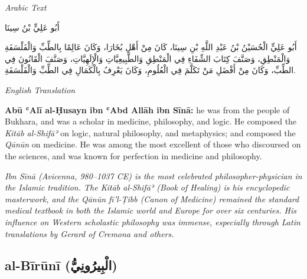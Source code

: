 \documentclass[11pt,a4paper]{article}
\def\RL#1{\beginR#1\endR}
\newcommand{\cnote}[1]{\textcolor{notecolor}{\textit{#1}}}
\newcommand{\textarabic}[1]{{\arabicfont\RL{#1}}}
\newenvironment{arabiccol}{%
  \begin{minipage}[t]{0.48\textwidth}%
  \begin{tcolorbox}[colback=leftbg,colframe=rulecolor,boxrule=0.4pt,arc=2pt,left=5pt,right=5pt,top=5pt,bottom=5pt]%
  \centering\textit{\footnotesize Arabic Text}\\[0.4em]%
  \raggedright\arabicfont\small%
}{%
  \end{tcolorbox}%
  \end{minipage}%
}
\newenvironment{englishcol}{%
  \begin{minipage}[t]{0.48\textwidth}%
  \begin{tcolorbox}[colback=rightbg,colframe=rulecolor,boxrule=0.4pt,arc=2pt,left=5pt,right=5pt,top=5pt,bottom=5pt]%
  \centering\textit{\footnotesize English Translation}\\[0.4em]%
  \raggedright\small%
}{%
  \end{tcolorbox}%
  \end{minipage}%
}
\begin{document}
\noindent
\begin{arabiccol}
\beginR
أَبُو عَلِيٍّ بْنُ سِينَا

أَبُو عَلِيٍّ الْحُسَيْنُ بْنُ عَبْدِ اللَّهِ بْنِ سِينَا، كَانَ مِنْ أَهْلِ بُخَارَا، وَكَانَ عَالِمًا بِالطِّبِّ وَالْفَلْسَفَةِ وَالْمَنْطِقِ، وَصَنَّفَ كِتَابَ الشِّفَاءِ فِي الْمَنْطِقِ وَالطَّبِيعِيَّاتِ وَالْإِلَهِيَّاتِ، وَصَنَّفَ الْقَانُونَ فِي الطِّبِّ، وَكَانَ مِنْ أَفْضَلِ مَنْ تَكَلَّمَ فِي الْعُلُومِ، وَكَانَ يَعْرِفُ بِالْكَمَالِ فِي الطِّبِّ وَالْفَلْسَفَةِ.
\endR
\end{arabiccol}
\hfill
\begin{englishcol}
\textbf{Abū ʿAlī al-Ḥusayn ibn ʿAbd Allāh ibn Sīnā:} he was from the people of Bukhara, and was a scholar in medicine, philosophy, and logic. He composed the \textit{Kitāb al-Shifāʾ} on logic, natural philosophy, and metaphysics; and composed the \textit{Qānūn} on medicine. He was among the most excellent of those who discoursed on the sciences, and was known for perfection in medicine and philosophy.

\cnote{Ibn Sīnā (Avicenna, 980--1037 CE) is the most celebrated philosopher-physician in the Islamic tradition. The \textit{Kitāb al-Shifāʾ} (Book of Healing) is his encyclopedic masterwork, and the \textit{Qānūn fī'l-Ṭibb} (Canon of Medicine) remained the standard medical textbook in both the Islamic world and Europe for over six centuries. His influence on Western scholastic philosophy was immense, especially through Latin translations by Gerard of Cremona and others.}
\end{englishcol}

\par\vspace{0.5em}

\subsection{al-Bīrūnī (\textarabic{الْبِيرُونِيُّ})}
\end{document}
